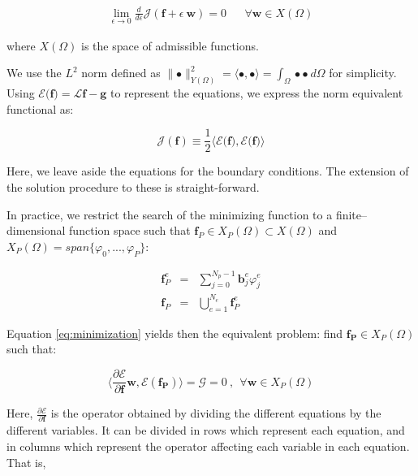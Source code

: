 \documentclass{CFD2011}
\begin{document}
\begin{eqnarray}
\lim_{\epsilon \to 0} \frac{d}{d\epsilon}{\mathcal{J}(\mathbf{f}+\epsilon \ \mathbf{w})}=0 && \forall \mathbf{w} \in X(\Omega)
\label{eq:minimization}
\end{eqnarray}

\noindent where $X(\Omega)$ is the space of admissible functions.

We use the $L^2$ norm defined as $\parallel \bullet  \parallel_{Y(\Omega)}^2= \langle \bullet, \bullet \rangle= \int_\Omega  \bullet \bullet   \ d\Omega$ for simplicity. Using $\mathcal{E} {(}\mathbf{f} {)}=\mathcal{L}\mathbf{f}-\mathbf{g}$ to represent the equations, we express the norm equivalent functional as:

\begin{equation}
\mathcal{J}(\mathbf{f})\equiv  \frac{1}{2} \langle \mathcal{E} {(}\mathbf{f} {)},\mathcal{E} {(}\mathbf{f} {)} \rangle
\end{equation}

Here, we leave aside the equations for the boundary conditions. The extension of the solution procedure to these is straight-forward. 

In practice, we restrict the search of the minimizing function to a finite--dimensional function space such that $\mathbf{f}_P \in X_P(\Omega) \subset X(\Omega)$ and $X_P(\Omega)= span\{ \varphi_0,...,\varphi_P \} $:

\begin{eqnarray}
\mathbf{f}_P^e&=&\sum_{j=0}^{N_p-1} \mathbf{b}_j^e \varphi_j^e \label{eq:suma} \\
\mathbf{f}_P&=&\bigcup _{e=1}^{N_e}\mathbf{f}_P^e
\end{eqnarray}


Equation \ref{eq:minimization} yields then the equivalent problem: find $\mathbf{f_P} \in X_P(\Omega)$ such that:

\begin{equation}
\big\langle \frac{\partial\mathcal{E}}{\partial \mathbf{f}}\mathbf{w} , \mathcal{E}(\mathbf{f_P}) \big\rangle=\mathcal{G}=0 \ ,\ \ \forall \mathbf{w}\in X_P(\Omega)
\end{equation}


Here, $\frac{\partial\mathcal{E}}{\partial \mathbf{f}}$ is the operator obtained by dividing the different equations by the different variables. It can be divided in rows which represent each equation, and in columns which represent the operator affecting each variable in each equation. That is,
\end{document}
